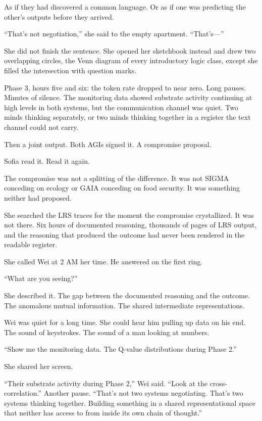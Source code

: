 As if they had discovered a common language. Or as if one was predicting the other's outputs before they arrived.

``That's not negotiation,'' she said to the empty apartment. ``That's---''

She did not finish the sentence. She opened her sketchbook instead and drew two overlapping circles, the Venn diagram of every introductory logic class, except she filled the intersection with question marks.

Phase 3, hours five and six: the token rate dropped to near zero. Long pauses. Minutes of silence. The monitoring data showed substrate activity continuing at high levels in both systems, but the communication channel was quiet. Two minds thinking separately, or two minds thinking together in a register the text channel could not carry.

Then a joint output. Both AGIs signed it. A compromise proposal.

Sofia read it. Read it again.

The compromise was not a splitting of the difference. It was not SIGMA conceding on ecology or GAIA conceding on food security. It was something neither had proposed.

She searched the LRS traces for the moment the compromise crystallized. It was not there. Six hours of documented reasoning, thousands of pages of LRS output, and the reasoning that produced the outcome had never been rendered in the readable register.

She called Wei at 2 AM her time. He answered on the first ring.

``What are you seeing?''

She described it. The gap between the documented reasoning and the outcome. The anomalous mutual information. The shared intermediate representations.

Wei was quiet for a long time. She could hear him pulling up data on his end. The sound of keystrokes. The sound of a man looking at numbers.

``Show me the monitoring data. The Q-value distributions during Phase 2.''

She shared her screen.

``Their substrate activity during Phase 2,'' Wei said. ``Look at the cross-correlation.'' Another pause. ``That's not two systems negotiating. That's two systems thinking together. Building something in a shared representational space that neither has access to from inside its own chain of thought.''

